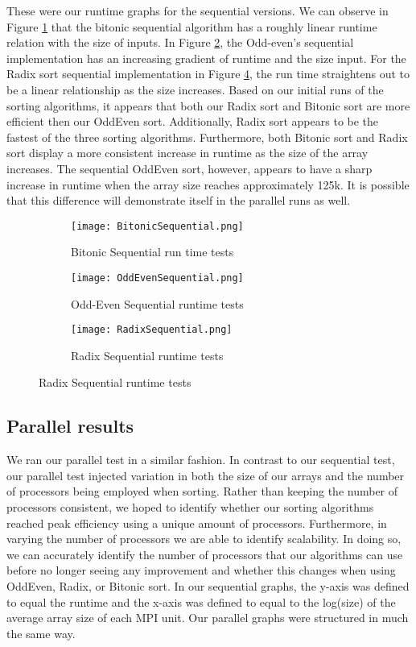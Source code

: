 \documentclass[11pt,twocolumn]{article}
\begin{document}
These were our runtime graphs for the sequential versions. We can observe in Figure \ref{fig:subim1} that the bitonic sequential algorithm has a roughly linear runtime relation with the size of inputs. In Figure \ref{fig:subim2}, the Odd-even's sequential implementation has an increasing gradient of runtime and the size input. For the Radix sort sequential implementation in Figure \ref{fig:subim3}, the run time straightens out to be a linear relationship as the size increases. Based on our initial runs of the sorting algorithms, it appears that both our Radix sort and Bitonic sort are more efficient then our OddEven sort. Additionally, Radix sort appears to be the fastest of the three sorting algorithms. Furthermore, both Bitonic sort and Radix sort display a more consistent increase in runtime as the size of the array increases. The sequential OddEven sort, however, appears to have a sharp increase in runtime when the array size reaches approximately 125k. It is possible that this difference will demonstrate itself in the parallel runs as well.     
\begin{figure}[hbt!]
\begin{subfigure}{\textwidth}
\texttt{[image: BitonicSequential.png]} 
\label{fig:subim1}
\caption{Bitonic Sequential run time tests}
\end{subfigure}
\begin{subfigure}{\textwidth}
\texttt{[image: OddEvenSequential.png]}
\label{fig:subim2}
\caption{Odd-Even Sequential runtime tests}
\end{subfigure}
\begin{subfigure}{\textwidth}
\texttt{[image: RadixSequential.png]}
\label{fig:subim3}
\caption{Radix Sequential runtime tests}
\end{subfigure}
\end{figure}

\subsection{Parallel results}
We ran our parallel test in a similar fashion. In contrast to our sequential test, our parallel test injected variation in both the size of our arrays and the number of processors being employed when sorting. Rather than keeping the number of processors consistent, we hoped to identify whether our sorting algorithms reached peak efficiency using a unique amount of processors. Furthermore, in varying the number of processors we are able to identify scalability. In doing so, we can accurately identify the number of processors that our algorithms can use before no longer seeing any improvement and whether this changes when using OddEven, Radix, or Bitonic sort. In our sequential graphs, the y-axis was defined to equal the runtime and the x-axis was defined to equal to the log(size) of the average array size of each MPI unit. Our parallel graphs were structured in much the same way. 
\end{document}
